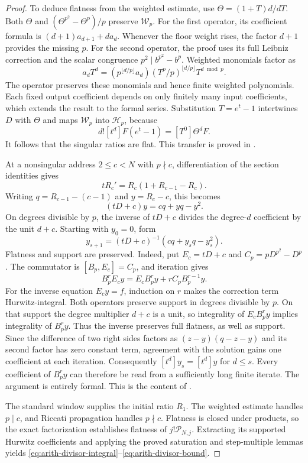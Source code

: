 \begin{proof}
To deduce flatness from the weighted estimate, use
$\Theta=(1+T)d/dT$.  Both $\Theta$ and
$(\Theta^{p^2}-\Theta^p)/p$ preserve $\mathcal W_p$.
For the first operator, its coefficient formula is
$(d+1)a_{d+1}+da_d$. Whenever the floor weight rises, the factor $d+1$
provides the missing $p$.  For the second operator, the proof uses its
full Leibniz correction and the scalar congruence
$p^2\mid b^{p^2}-b^p$.  Weighted monomials factor as
\[
 a_dT^d=(p^{\lfloor d/p\rfloor}a_d)
          (T^p/p)^{\lfloor d/p\rfloor}T^{d\bmod p}.
\]
The operator preserves these monomials and hence finite weighted
polynomials.  Each fixed output coefficient depends on only finitely many
input coefficients, which extends the result to the formal series.
Substitution $T=e^t-1$ intertwines $D$ with $\Theta$ and maps
$\mathcal W_p$ into $\mathcal H_p$, because
\[
 d![t^d]F(e^t-1)=[T^0]\Theta^dF.
\]
It follows that the singular ratios are flat.  This transfer is proved in
.

At a nonsingular address $2\le c<N$ with $p\nmid c$, differentiation of the section
identities gives
\[
 tR_c'=R_c(1+R_{c-1}-R_c).
\]
Writing $q=R_{c-1}-(c-1)$ and $y=R_c-c$, this becomes
\[
 (tD+c)y=cq+yq-y^2.
\]
On degrees divisible by $p$, the inverse of $tD+c$ divides the degree-$d$
coefficient by the unit $d+c$.  Starting with $y_0=0$, form
\[
 y_{s+1}=(tD+c)^{-1}(cq+y_sq-y_s^2).
\]
Flatness and support are preserved. Indeed, put $E_c=tD+c$ and $C_p=pD^{p^2}-D^p$.
The commutator is $[B_p,E_c]=C_p$, and iteration gives
\[
 B_p^rE_cy=E_cB_p^ry+rC_pB_p^{r-1}y.
\]
For the inverse equation $E_cy=f$, induction on $r$ makes the
correction term Hurwitz-integral. Both operators preserve support in
degrees divisible by $p$. On that support the degree multiplier $d+c$
is a unit, so integrality of $E_cB_p^ry$ implies integrality of
$B_p^ry$. Thus the inverse preserves full flatness, as well as support.
 Since the difference of two right
sides factors as $(z-y)(q-z-y)$ and its second factor has zero constant
term, agreement with the solution gains one coefficient at each iteration.
Consequently $[t^d]y_s=[t^d]y$ for $d\le s$.
Every coefficient of $B_p^r y$ can therefore be read from a sufficiently
long finite iterate.  The argument is entirely formal.
This is the content of
.

The standard window supplies the initial ratio $R_1$.  The weighted
estimate handles $p\mid c$, and Riccati propagation handles $p\nmid c$.
Flatness is closed under products, so the exact factorization establishes
flatness of $j!\mathcal P_{N,j}$.  Extracting its supported Hurwitz coefficients
and applying the proved saturation and step-multiple lemmas yields
\eqref{eq:arith-divisor-integral}--\eqref{eq:arith-divisor-bound}.


\end{proof}

